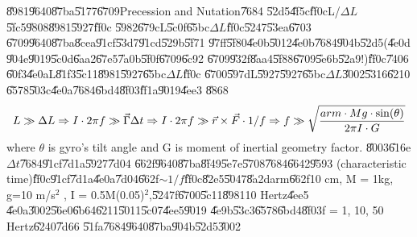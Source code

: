 \begin{remark}
\U{8981}\U{9640}\U{87ba}\U{5177}\U{6709}Precession and Nutation\U{7684}%
\U{52d5}\U{4f5c}\U{ff0c}L/$\Delta L$\U{5fc5}\U{9808}\U{8981}\U{5927}\U{ff0c}%
\U{5982}\U{679c}L\U{5c0f}\U{65bc}$\Delta L$\U{ff0c}\U{5247}\U{53ea}\U{6703}%
\U{6709}\U{9640}\U{87ba}\U{8cea}\U{91cf}\U{53d7}\U{91cd}\U{529b}\U{5f71}%
\U{97ff}\U{5f80}\U{4e0b}\U{5012}\U{4e0b}\U{7684}\U{904b}\U{52d5}(\U{4e0d}%
\U{904e}\U{9019}\U{5c0d}\U{6aa2}\U{67e5}\U{7a0b}\U{5f0f}\U{6709}\U{6c92}%
\U{6709}\U{932f}\U{8aa4}\U{5f88}\U{6709}\U{5e6b}\U{52a9}!)\U{ff0c}\U{7406}%
\U{60f3}\U{4e0a}L\U{81f3}\U{5c11}\U{8981}\U{5927}\U{65bc}$\Delta L$\U{ff0c}%
\U{6700}\U{597d}L\U{5927}\U{5927}\U{65bc}$\Delta L$\U{3002}\U{5316}\U{6210}%
\U{6578}\U{503c}\U{4e0a}\U{7684}\U{6bd4}\U{8f03}\U{ff1a}\U{9019}\U{4ee3}%
\U{8868}%
\begin{equation}
L\gg \Delta L\Rightarrow I\cdot 2\pi f\gg \vec{\Gamma}\Delta t\Rightarrow
I\cdot 2\pi f\gg \vec{r}\times \vec{F}\cdot 1/f\Rightarrow f\gg \sqrt{\frac{%
arm\cdot Mg\cdot \sin (\theta )}{2\pi I\cdot G}}
\end{equation}%
where $\theta $ is gyro's tilt angle and G is moment of inertial geometry
factor. \U{8003}\U{616e}$\Delta t$\U{7684}\U{91cf}\U{7d1a}\U{5927}\U{7d04}%
\U{662f}\U{9640}\U{87ba}\U{8f49}\U{5e7e}\U{5708}\U{7684}\U{6642}\U{9593}%
(characteristic time)\U{ff0c}\U{91cf}\U{7d1a}\U{4e0a}\U{7d04}\U{662f}$\sim
1/f$\U{ff0c}\U{82e5}\U{5047}\U{8a2d}arm\U{662f}10 cm, M = 1kg, g=10 m/s$^{2}$%
, I = 0.5M(0.05)$^{2}$,\U{5247}f\U{6700}\U{5c11}\U{8981}10 Hertz\U{4ee5}%
\U{4e0a}\U{3002}\U{56e0}\U{6b64}\U{6211}\U{5011}\U{5c07}\U{4ee5}\U{9019}%
\U{4e9b}\U{53c3}\U{6578}\U{6bd4}\U{8f03}f = 1, 10, 50 Hertz\U{6240}\U{7d66}%
\U{51fa}\U{7684}\U{9640}\U{87ba}\U{904b}\U{52d5}\U{3002}
\end{remark}
